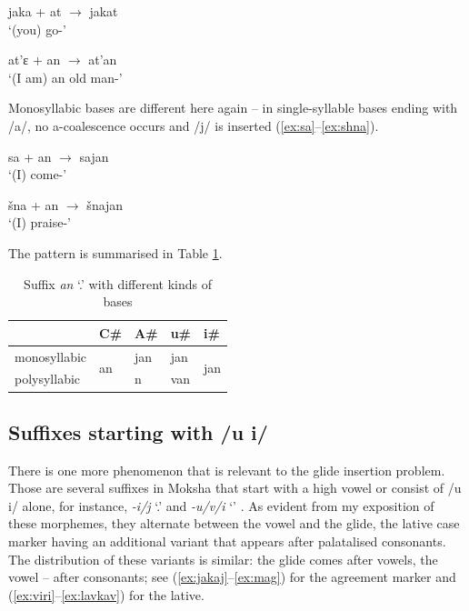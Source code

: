 \documentclass[a4paper, 12pt]{article}
\begin{document}
\begin{minipage}[t]{.45\linewidth}
\ex\label{ex:jaka}
	jaka + at $\rightarrow$ jakat \\`(you) go-{\Ssg}'
\xe
\end{minipage}
\hfill
\begin{minipage}[t]{.45\linewidth}
\ex\label{ex:atya}
	at'ɛ + an $\rightarrow$ at'an \\`(I am) an old man-{\Fsg}' 
\xe
\end{minipage}	

	\noindent Monosyllabic bases are different here again -- in single-syllable bases ending with /a/, no a-coalescence occurs and /j/ is inserted (\ref{ex:sa}--\ref{ex:shna}).
	
\begin{minipage}[t]{.45\linewidth}
\ex\label{ex:sa}
	sa + an $\rightarrow$ sajan \\`(I) come-{\Fsg}'
\xe
\end{minipage}
\hfill
\begin{minipage}[t]{.45\linewidth}
\ex\label{ex:shna}
	šna + an $\rightarrow$ šnajan \\`(I) praise-{\Fsg}'
\xe
\end{minipage}	

	The pattern is summarised in Table \ref{tab:glidesan}.
	
\begin{table}[H]
\centering
\begin{tabular}{lllll}
\toprule
              & C\#                 & A\# & u\# & i\#                  \\
\midrule
monosyllabic  & \multirow{2}{*}{an} & jan & jan & \multirow{2}{*}{jan} \\
polysyllabic &                     & n   & van &                     \\
\bottomrule
\end{tabular}
\caption{Suffix \emph{an} `{\Npst}.{\Fsg}' with different kinds of bases}
\label{tab:glidesan}
\end{table}
			
			\subsection{Suffixes starting with /u i/}
			
	There is one more phenomenon that is relevant to the glide insertion problem. Those are several suffixes in Moksha that start with a high vowel or consist of /u i/ alone, for instance, \emph{-i/j} `{\Npst}.{\Tsg}' and \emph{-u/v/i} `{\Lat}' \parencite{kozlov2018}. As evident from my exposition of these morphemes, they alternate between the vowel and the glide, the lative case marker having an additional variant that appears after palatalised consonants. The distribution of these variants is similar: the glide comes after vowels, the vowel -- after consonants; see (\ref{ex:jakaj}--\ref{ex:mag}) for the {\Tsg} agreement marker and (\ref{ex:viri}--\ref{ex:lavkav}) for the lative.
	
\end{document}

